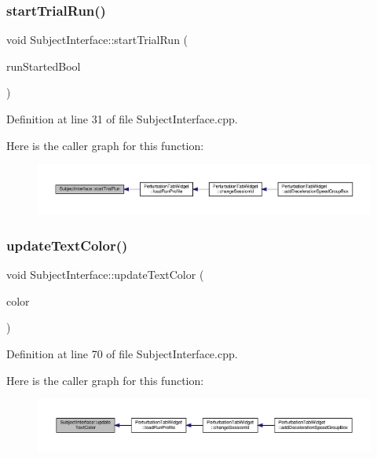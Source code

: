 \subsubsection{\texorpdfstring{start\+Trial\+Run()}{startTrialRun()}}
{\footnotesize\ttfamily void Subject\+Interface\+::start\+Trial\+Run (\begin{DoxyParamCaption}\item[{bool}]{run\+Started\+Bool }\end{DoxyParamCaption})}



Definition at line 31 of file Subject\+Interface.\+cpp.

Here is the caller graph for this function\+:
\nopagebreak
\begin{figure}[H]
\begin{center}
\leavevmode
\includegraphics[width=350pt]{class_subject_interface_aab83bd19dd636c8902a3e04aa8851cd2_icgraph}
\end{center}
\end{figure}
\mbox{\label{class_subject_interface_ac02d6d105e271c6ebed5917c68942a2c}} 
\subsubsection{\texorpdfstring{update\+Text\+Color()}{updateTextColor()}}
{\footnotesize\ttfamily void Subject\+Interface\+::update\+Text\+Color (\begin{DoxyParamCaption}\item[{Q\+String}]{color }\end{DoxyParamCaption})}



Definition at line 70 of file Subject\+Interface.\+cpp.

Here is the caller graph for this function\+:
\nopagebreak
\begin{figure}[H]
\begin{center}
\leavevmode
\includegraphics[width=350pt]{class_subject_interface_ac02d6d105e271c6ebed5917c68942a2c_icgraph}
\end{center}
\end{figure}
\mbox{\label{class_subject_interface_ab843d4b0a55c2a0126f4406db1e93069}} 
